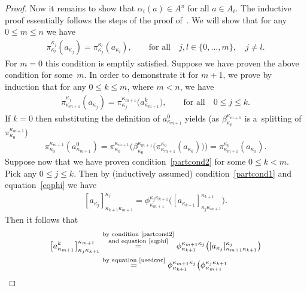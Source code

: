 \documentclass[pdftex]{sigma}
\begin{document}
\begin{proof}
Now it remains to show that $\alpha_i(a)\in A^\pi$ for all $a\in A_i$.
The inductive proof essentially follows the steps of the proof of~\cite[Proposition~9]{CM2000}.
We will show that for any $0\leq m\leq n$ we have
\begin{gather}
\label{partcond1}
\pi^{\kappa_j}_{\kappa_l}(a_{\kappa_j})=\pi^{\kappa_l}_{\kappa_j}(a_{\kappa_l}),
\qquad
\text{for all}
\quad
j,l\in\{0,\ldots,m\},
\quad
j\neq l.
\end{gather}
For $m=0$ this condition is emptily satisf\/ied.
Suppose we have proven the above condition for some~$m$.
In order to demonstrate it for $m+1$, we prove by induction that for any $0\leq k\leq m$, where $m<n$, we have
\begin{gather}
\label{partcond2}
\pi^{\kappa_j}_{\kappa_{m+1}}(a_{\kappa_j})=\pi^{\kappa_{m+1}}_{\kappa_j}\big(a^k_{\kappa_{m+1}}\big),
\qquad
\text{for all}
\quad
0\leq j\leq k.
\end{gather}
If $k=0$ then substituting the def\/inition of $a^0_{\kappa_{m+1}}$ yields (as $\beta^{\kappa_{m+1}}_{\kappa_0}$ is
a~splitting of $\pi^{\kappa_{m+1}}_{\kappa_0}$)
\begin{gather*}
\pi^{\kappa_{m+1}}_{\kappa_0}(a^0_{\kappa_{m+1}}) =\pi^{\kappa_{m+1}}_{\kappa_0}
\big(\beta^{\kappa_{m+1}}_{\kappa_0}\big(\pi^{\kappa_0}_{\kappa_{m+1}}(a_{\kappa_0})\big)\big)
 =\pi^{\kappa_0}_{\kappa_{m+1}}(a_{\kappa_0}).
\end{gather*}
Suppose now that we have proven condition~\eqref{partcond2} for some $0\leq k<m$.
Pick any $0\leq j\leq k$.
Then by (inductively assumed) condition~\eqref{partcond1} and equation~\eqref{eqphi} we have
\begin{gather}
\label{usedcoc}
[a_{\kappa_j}]^{\kappa_j}_{\kappa_{k+1}\kappa_{m+1}}=\phi^{\kappa_j\kappa_{k+1}}_{\kappa_{m+1}}
\big([a_{\kappa_{k+1}}]^{\kappa_{k+1}}_{\kappa_j\kappa_{m+1}}\big).
\end{gather}
Then it follows that
\begin{gather*}
\big[a^k_{\kappa_{m+1}}\big]^{\kappa_{m+1}}_{\kappa_j\kappa_{k+1}}
\overset{\substack{\text{by condition~\eqref{partcond2}} \\ \text{and equation~\eqref{eqphi}}}}{=}\phi^{\kappa_{m+1}\kappa_j}_{\kappa_{k+1}}
\big([a_{\kappa_j}]^{\kappa_j}_{\kappa_{m+1}\kappa_{k+1}}\big)
\\
\qquad{}
\overset{\text{by equation~\eqref{usedcoc}}}{=}
\phi^{\kappa_{m+1}\kappa_j}_{\kappa_{k+1}}\big(\phi^{\kappa_j\kappa_{k+1}}_{\kappa_{m+1}}

\end{gather*}
\end{proof}
\end{document}
